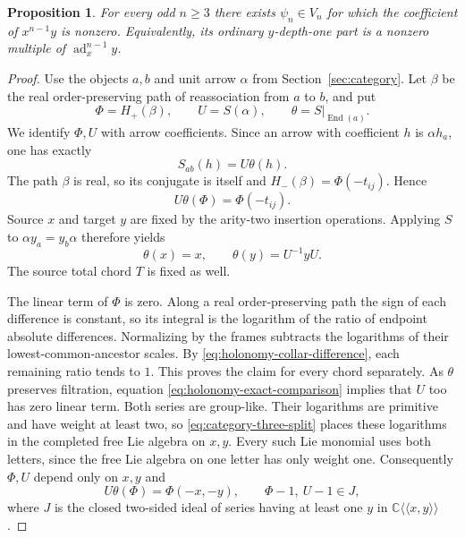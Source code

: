 \documentclass[11pt]{article}
\newtheorem{proposition}[theorem]{Proposition}
\theoremstyle{definition}
\theoremstyle{remark}
\numberwithin{equation}{section}
\begin{document}
\begin{proposition}\label{prop:odd-depth-one}
For every odd $n\geq3$ there exists $\psi_n\in V_n$ for which the
coefficient of $x^{n-1}y$ is nonzero.  Equivalently, its ordinary
$y$-depth-one part is a nonzero multiple of $\operatorname{ad}_x^{n-1}y$.
\end{proposition}

\begin{proof}
Use the objects $a,b$ and unit arrow $\alpha$ from
Section~\ref{sec:category}.  Let $\beta$ be the real order-preserving
path of reassociation from $a$ to $b$, and put
\[
 \Phi=H_+(\beta),\qquad U=S(\alpha),\qquad
 \theta=S|_{\operatorname{End}(a)}.
\]
We identify $\Phi,U$ with arrow coefficients.  Since an arrow with
coefficient $h$ is $\alpha h_a$, one has exactly
\begin{equation}\label{eq:holonomy-arrow-action}
 S_{ab}(h)=U\theta(h).
\end{equation}
The path $\beta$ is real, so its conjugate is itself and
$H_-(\beta)=\Phi(-t_{ij})$.  Hence
\begin{equation}\label{eq:holonomy-exact-comparison}
 U\theta(\Phi)=\Phi(-t_{ij}).
\end{equation}
Source $x$ and target $y$ are fixed by the arity-two insertion
operations.  Applying $S$ to $\alpha y_a=y_b\alpha$ therefore yields
\begin{equation}\label{eq:holonomy-source-action}
 \theta(x)=x,\qquad \theta(y)=U^{-1}yU.
\end{equation}
The source total chord $T$ is fixed as well.

The linear term of $\Phi$ is zero.  Along a real order-preserving
path the sign of each difference is constant, so its integral is the
logarithm of the ratio of endpoint absolute differences.  Normalizing
by the frames subtracts the logarithms of their lowest-common-ancestor
scales.  By \eqref{eq:holonomy-collar-difference}, each remaining
ratio tends to $1$.  This proves the claim for every chord separately.
As $\theta$ preserves filtration, equation
\eqref{eq:holonomy-exact-comparison} implies that $U$ too has zero
linear term.  Both series are group-like.  Their logarithms are
primitive and have weight at least two, so
\eqref{eq:category-three-split} places these logarithms in the
completed free Lie algebra on $x,y$.  Every such Lie monomial uses
both letters, since the free Lie algebra on one letter has only
weight one.  Consequently $\Phi,U$ depend only on $x,y$ and
\begin{equation}\label{eq:holonomy-exact-xy}
 U\theta(\Phi)=\Phi(-x,-y),\qquad
 \Phi-1,\ U-1\in J,
\end{equation}
where $J$ is the closed two-sided ideal of series having at least one
$y$ in $\mathbb C\langle\!\langle x,y\rangle\!\rangle$.


\end{proof}
\end{document}
